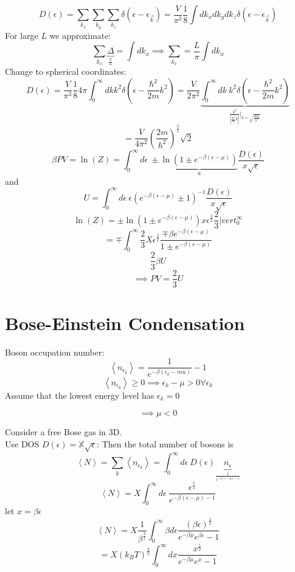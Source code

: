 \documentclass[11pt]{book}
\theoremstyle{definition}
\begin{document}
\[ D(\epsilon) = \sum_{k_x} \sum_{k_y} \sum_{k_z} \delta( \epsilon- \epsilon_{\vec{k}}) = \frac{V}{\pi^3} \frac{1}{8} \int dk_x dk_y dk_z \delta( \epsilon - \epsilon_{\vec{k}} ) \] 
For large $ L $ we approximate:
\[ \sum_{k_x} \underbrace{\Delta}_{\frac{\pi}{L}} = \int dk_x \implies \sum_{k_{x}} = \frac{L}{\pi} \int dk_x\] 
Change to spherical coordinates:
\[ D( \epsilon) = \frac{V}{\pi^3} \frac{1}{8} 4\pi \int_{0}^{\infty} dk k^2 \delta( \epsilon - \frac{\hbar^2}{2m}k^2 ) = \frac{V}{2\pi^2} 
\underbrace{\int_{0}^{\infty} dk \: k^2 \delta( \epsilon - \frac{\hbar^2}{2m}k^2 ) }_{\frac{k^2}{\left|\frac{\hbar^2}{m}k\right|} \vert_{k= \sqrt{\frac{2m \epsilon}{\hbar^2}}}}
\] 
\[  = \frac{V}{4\pi^2} \left( \frac{2m}{\hbar^2} \right)^{\frac{3}{1}} \sqrt{2} \] 
\[ \beta PV = \ln(Z) = \int_0^{\infty} d\epsilon \: \pm 
\underbrace{\ln(1\pm e^{-\beta( \epsilon - \mu )})}_{u}  
\frac{D(\epsilon)}{x\sqrt{\epsilon}}
\] 
and
\[ U = \int_0^{\infty} d\epsilon \: \epsilon \left( e^{-\beta(\epsilon-\mu)} \pm 1 \right)^{-1} \frac{D(\epsilon)}{x\sqrt{\epsilon}}  \] 
\[ \ln(Z) = \pm \ln(1 \pm e^{-\beta( \epsilon-\mu )}) x \epsilon^{\frac{3}{2}} \frac{2}{3} |vert_{0}^{\infty}   \] 
\[  = \mp \int_0^{\infty} \frac{2}{3}X \epsilon^{\frac{3}{2}} \frac{\mp \beta e^{-\beta(\epsilon-\mu)}}{1 \pm e^{-\beta (\epsilon-\mu)}}\] 
\[ \frac{2}{3}\beta U \] 
\[ \implies PV = \frac{2}{3}U \] 

\section{Bose-Einstein Condensation}
Boson occupation number:
\[ \left \langle n_{ \epsilon_k } \right \rangle = \frac{1}{e^{-\beta( \epsilon_k - mu )}} -1\] 
\[ \left \langle n_{ \epsilon_k } \right \rangle \geq 0 \implies
\epsilon_k-\mu > 0 \forall \epsilon_k\] 
Assume that the lowest energy level has $ \epsilon_k = 0$ 
\begin{shaded*}
\[ \implies \mu < 0 \] 
\end{shaded*}

Consider a free Bose gas in 3D. \\
Use DOS $ D( \epsilon ) = \mathbb{X} \sqrt{ \epsilon }$: 
Then the total number of bosons is
\[ \left \langle N \right \rangle = \sum_k \left \langle n_{ \epsilon_k } \right \rangle = \int_{0}^{\infty} d \epsilon \: D( \epsilon ) 
\underbrace{n_{\epsilon}}_{\frac{1}{e^{-\beta( \epsilon-\mu )-1}}} \] 
\[ \left \langle N \right \rangle = X \int_{0}^{\infty} d \epsilon \: \frac{ \epsilon^{\frac{1}{2}}}{e^{-\beta( \epsilon-\mu )-1}} \] 
let $ x = \beta \epsilon $ 
\[ \left \langle N \right \rangle = X \frac{1}{\beta^{\frac{3}{2}}} \int_0^{\infty} \beta d \epsilon \frac{(\beta \epsilon)^{ \frac{1}{2} }}{e^{-\beta \mu } e^{\beta \epsilon}-1}\] 
\[ = X (k_BT)^{\frac{3}{2}} \int_0^{\infty} dx \frac{x^{ \frac{1}{2} }}{e^{-\beta \mu}e^{x}-1} \] 
\end{document}
